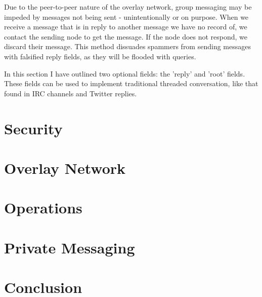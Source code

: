 \documentclass[10pt,a4paper,onecolumn]{article}
\begin{document}
Due to the peer-to-peer nature of the overlay network, group messaging may be impeded by messages not being sent - unintentionally or on purpose. When we receive a message that is in reply to another message we have no record of, we contact the sending node to get the message. If the node does not respond, we discard their message. This method dissuades spammers from sending messages with falsified reply fields, as they will be flooded with queries. 

In this section I have outlined two optional fields: the 'reply' and 'root' fields. These fields can be used to implement traditional threaded conversation, like that found in IRC channels and Twitter replies.

\section{Security}
\section{Overlay Network}
\section{Operations}
\section{Private Messaging}

\section{Conclusion}
\end{document}
